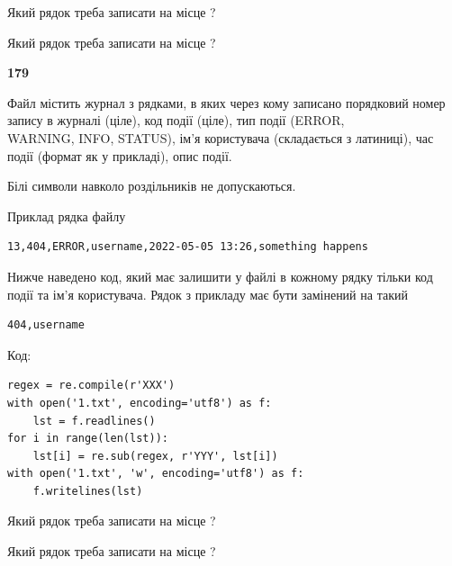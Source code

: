 Який рядок треба записати на місце  ?\par
\vspace{5mm}


Який рядок треба записати на місце  ?\par


\newpage

{\begin {center}\textbf{ 179}\end {center}}\par
Файл  містить журнал з рядками, в яких через кому записано поряд\-ко\-вий номер запису в журналі (ціле), код події (ціле), тип події (ERROR, \\WARNING, INFO, STATUS), ім'я користувача (складається з латиниці), час події (фор\-мат як у прикладі), опис події.

Білі символи навколо роздільників не допускаються.

Приклад рядка файлу



\begin{verbatim}
13,404,ERROR,username,2022-05-05 13:26,something happens
\end{verbatim}


Нижче наведено код, який має залишити у файлі в кожному рядку тільки код події та ім'я користувача. Рядок з прикладу має бути замінений на такий



\begin{verbatim}
404,username
\end{verbatim}




Код:



\begin{verbatim}
regex = re.compile(r'XXX')
with open('1.txt', encoding='utf8') as f:
    lst = f.readlines()
for i in range(len(lst)):
    lst[i] = re.sub(regex, r'YYY', lst[i])
with open('1.txt', 'w', encoding='utf8') as f:
    f.writelines(lst)
\end{verbatim}







Який рядок треба записати на місце  ?\par
\vspace{5mm}


Який рядок треба записати на місце  ?\par


